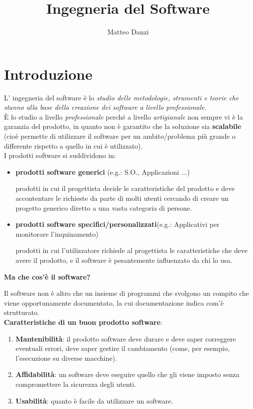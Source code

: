 \documentclass[a4paper, 10pt]{article}
\title{Ingegneria del Software}
\date{}
\author{Matteo Danzi}
\begin{document}
	\maketitle
	
	\tableofcontents
	
	\newpage
	
	\section{Introduzione}
	L' ingegneria del software è lo \textit{studio delle metodologie, strumenti e teorie che
	stanno alla base della creazione dei software a livello professionale}.\\

	\noindent
	È lo studio a livello \textit{professionale} perché a livello \textit{artigianale} non sempre vi è la garanzia del prodotto, in quanto non è garantito che la soluzione sia \textbf{scalabile} (cioè
	permette di utilizzare il software per un ambito/problema più grande o differente rispetto a quello in cui è utilizzato).\\
	
	\noindent
	I prodotti software si suddividono in:
	\begin{itemize}
		\item \textbf{prodotti software generici} (e.g.: S.O., Applicazioni ...)
		
		prodotti in cui il progettista decide le caratteristiche del prodotto e deve accontentare le richieste da parte di molti utenti cercando di creare un progetto generico diretto a  una vasta categoria di persone.
		\item \textbf{prodotti software specifici/personalizzati}(e.g.: Applicativi per monitorare l'inquinamento)
		
		prodotti in cui l'utilizzatore richiede al progettista le caratteristiche che deve avere il prodotto, e il software è pesantemente influenzato da chi lo usa.
	\end{itemize}

	\noindent
	\textbf{Ma che cos'è il software?} 
	
	\noindent
	Il software non è altro che un insieme di programmi che svolgono un compito che viene opportunamente documentato, la cui documentazione indica com'è strutturato. \\
	
	\noindent
	\textbf{Caratteristiche di un buon prodotto software}:
	\begin{enumerate}
		\item \textbf{Mantenibilità}: il prodotto software deve durare e deve saper correggere
		eventuali errori, deve saper gestire il cambiamento (come, per esempio, l'esecuzione su diverse macchine).
		\item \textbf{Affidabilità}: un software deve eseguire quello che gli viene imposto senza
		compromettere la sicurezza degli utenti.
		\item \textbf{Usabilità}: quanto è facile da utilizzare un software.
	\end{enumerate}
	
\end{document}
